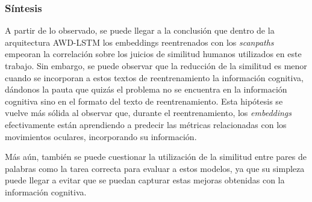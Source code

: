 \subsubsection{Síntesis}

A partir de lo observado, se puede llegar a la conclusión que dentro de la 
arquitectura AWD-LSTM los embeddings reentrenados con los \textit{scanpaths} 
empeoran la correlación sobre los juicios de similitud humanos utilizados 
en este trabajo. Sin embargo, se puede observar que la reducción de la similitud 
es menor cuando se incorporan a estos textos de reentrenamiento la información 
cognitiva, dándonos la pauta que quizás el problema no se encuentra en la 
información cognitiva sino en el formato del texto de reentrenamiento. 
Esta hipótesis se vuelve más sólida al observar que, durante el reentrenamiento, 
los \textit{embeddings} efectivamente están aprendiendo a predecir las métricas relacionadas 
con los movimientos oculares, incorporando su información.

Más aún, también se puede cuestionar la utilización de la similitud entre 
pares de palabras como la tarea correcta para evaluar a estos modelos, ya 
que su simpleza puede llegar a evitar que se puedan capturar estas 
mejoras obtenidas con la información cognitiva.





